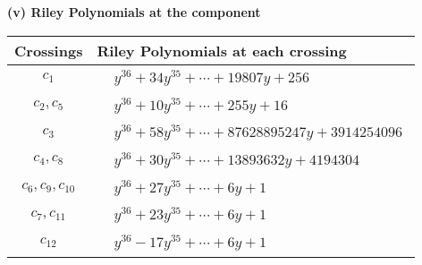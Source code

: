 \documentclass[1p]{elsarticle_modified}
\theoremstyle{definition}
\begin{document}
\flushleft \textbf{(v) Riley Polynomials at the component}\newline \\
\begin{tabular}{m{50pt}|m{274pt}}
Crossings & \hspace{64pt}Riley Polynomials at each crossing \\
\hline $$\begin{aligned}c_{1}\end{aligned}$$&$\begin{aligned}
&y^{36}+34 y^{35}+\cdots+19807 y+256
\end{aligned}$\\
\hline $$\begin{aligned}c_{2},c_{5}\end{aligned}$$&$\begin{aligned}
&y^{36}+10 y^{35}+\cdots+255 y+16
\end{aligned}$\\
\hline $$\begin{aligned}c_{3}\end{aligned}$$&$\begin{aligned}
&y^{36}+58 y^{35}+\cdots+87628895247 y+3914254096
\end{aligned}$\\
\hline $$\begin{aligned}c_{4},c_{8}\end{aligned}$$&$\begin{aligned}
&y^{36}+30 y^{35}+\cdots+13893632 y+4194304
\end{aligned}$\\
\hline $$\begin{aligned}c_{6},c_{9},c_{10}\end{aligned}$$&$\begin{aligned}
&y^{36}+27 y^{35}+\cdots+6 y+1
\end{aligned}$\\
\hline $$\begin{aligned}c_{7},c_{11}\end{aligned}$$&$\begin{aligned}
&y^{36}+23 y^{35}+\cdots+6 y+1
\end{aligned}$\\
\hline $$\begin{aligned}c_{12}\end{aligned}$$&$\begin{aligned}
&y^{36}-17 y^{35}+\cdots+6 y+1
\end{aligned}$\\
\hline
\end{tabular}\\~\\
\end{document}
